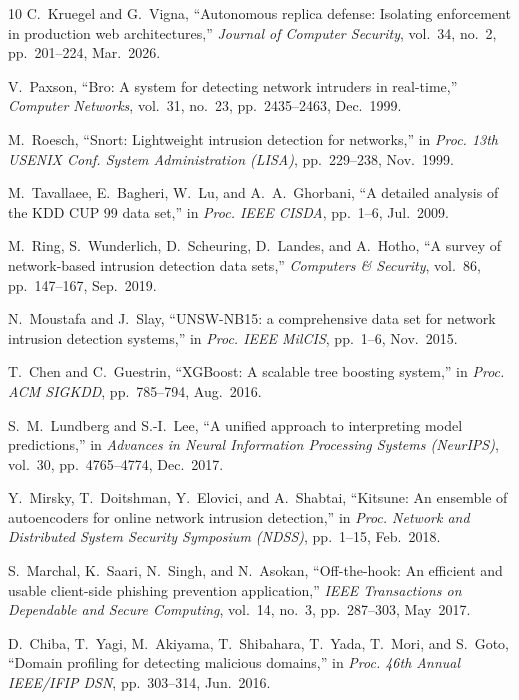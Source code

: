 \documentclass[conference,10pt,twocolumn]{IEEEtran}
\begin{document}
\begin{thebibliography}{10}
C.~Kruegel and G.~Vigna, ``Autonomous replica defense: Isolating enforcement in production web architectures,'' \emph{Journal of Computer Security}, vol.~34, no.~2, pp.~201--224, Mar.~2026.

V.~Paxson, ``Bro: A system for detecting network intruders in real-time,'' \emph{Computer Networks}, vol.~31, no.~23, pp.~2435--2463, Dec.~1999.

M.~Roesch, ``Snort: Lightweight intrusion detection for networks,'' in \emph{Proc. 13th USENIX Conf. System Administration (LISA)}, pp.~229--238, Nov.~1999.

M.~Tavallaee, E.~Bagheri, W.~Lu, and A.~A.~Ghorbani, ``A detailed analysis of the KDD CUP 99 data set,'' in \emph{Proc. IEEE CISDA}, pp.~1--6, Jul.~2009.

M.~Ring, S.~Wunderlich, D.~Scheuring, D.~Landes, and A.~Hotho, ``A survey of network-based intrusion detection data sets,'' \emph{Computers \& Security}, vol.~86, pp.~147--167, Sep.~2019.

N.~Moustafa and J.~Slay, ``UNSW-NB15: a comprehensive data set for network intrusion detection systems,'' in \emph{Proc. IEEE MilCIS}, pp.~1--6, Nov.~2015.

T.~Chen and C.~Guestrin, ``XGBoost: A scalable tree boosting system,'' in \emph{Proc. ACM SIGKDD}, pp.~785--794, Aug.~2016.

S.~M.~Lundberg and S.-I.~Lee, ``A unified approach to interpreting model predictions,'' in \emph{Advances in Neural Information Processing Systems (NeurIPS)}, vol.~30, pp.~4765--4774, Dec.~2017.

Y.~Mirsky, T.~Doitshman, Y.~Elovici, and A.~Shabtai, ``Kitsune: An ensemble of autoencoders for online network intrusion detection,'' in \emph{Proc. Network and Distributed System Security Symposium (NDSS)}, pp.~1--15, Feb.~2018.

S.~Marchal, K.~Saari, N.~Singh, and N.~Asokan, ``Off-the-hook: An efficient and usable client-side phishing prevention application,'' \emph{IEEE Transactions on Dependable and Secure Computing}, vol.~14, no.~3, pp.~287--303, May~2017.

D.~Chiba, T.~Yagi, M.~Akiyama, T.~Shibahara, T.~Yada, T.~Mori, and S.~Goto, ``Domain profiling for detecting malicious domains,'' in \emph{Proc. 46th Annual IEEE/IFIP DSN}, pp.~303--314, Jun.~2016.

\end{thebibliography}
\end{document}
